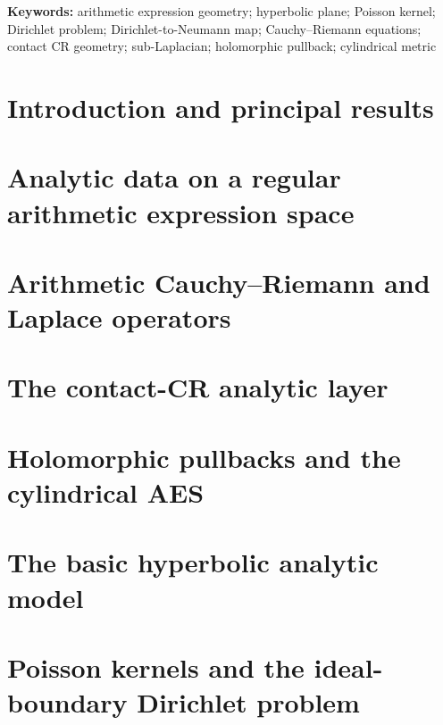 \documentclass[11pt]{article}
\theoremstyle{definition}
\theoremstyle{remark}
\begin{document}
\noindent\textbf{Keywords:}
arithmetic expression geometry; hyperbolic plane; Poisson kernel; Dirichlet problem;
Dirichlet-to-Neumann map; Cauchy--Riemann equations; contact CR geometry;
sub-Laplacian; holomorphic pullback; cylindrical metric

\setcounter{tocdepth}{2}
\tableofcontents
\newpage

\section{Introduction and principal results}\label{sec:introduction}


\section{Analytic data on a regular arithmetic expression space}
\label{sec:analytic-data}


\section{Arithmetic Cauchy--Riemann and Laplace operators}
\label{sec:surface-operators}


\section{The contact-CR analytic layer}\label{sec:contact-analysis}


\section{Holomorphic pullbacks and the cylindrical AES}
\label{sec:pullback-cylinder}


\section{The basic hyperbolic analytic model}\label{sec:hyperbolic-analysis}


\section{Poisson kernels and the ideal-boundary Dirichlet problem}
\label{sec:poisson-dirichlet}

\end{document}
